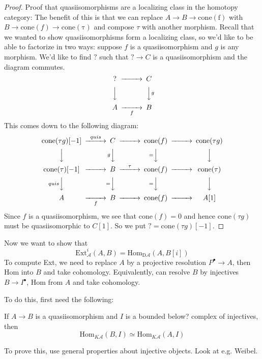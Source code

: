 \begin{proof}
    Proof that quasiisomorphisms are a localizing class in the homotopy category:  
    The benefit of this is that we can replace $A\rightarrow B\rightarrow \mathrm{cone(f)}$ with $B\rightarrow \mathrm{cone}(f)\rightarrow \mathrm{cone(\tau)}$ and compose $\tau$ with another morphism. Recall that we wanted to show quasiisomorphisms form a localizing class, so we'd like to be able to factorize in two ways: suppose $f$ is a quasiisomorphism and $g$ is any morphism. We'd like to find $?$ such that $?\rightarrow C$ is a quasiisomorphism and the diagram commutes.
    $$\begin{CD} ? @> > > C \\ @VVV @VVgV \\ A @> > f> B\end{CD}$$
    This comes down to the following diagram: 
    $$\begin{CD} \mathrm{cone}(\tau g)[-1]@> quis> > C @> > > \mathrm{cone}(f) @> > > \mathrm{cone}(\tau g)\\ @VVV @VgVV @V=VV @VVV \\ \mathrm{cone(\tau)[-1]}@> > > B @> \tau> > \mathrm{cone}(f)@> > > \mathrm{cone}(\tau) \\ @VquisVV @V=VV @V=VV @VVV \\ A @> > f > B @> > > \mathrm{cone}(f)@> > > A[1]\end{CD}$$
    Since $f$ is a quasiisomorphism, we see that $\mathrm{cone}(f)=0$ and hence $\mathrm{cone}(\tau g)$ must be quasiisomorphic to $C[1]$. So we put $?=\mathrm{cone}(\tau g)[-1]$.
\end{proof} 

Now we want to show that $$\mathrm{Ext}_{\mathcal{A}}^i(A,B)=\mathrm{Hom_{D \mathcal{A}}}(A, B[i])$$
To compute Ext, we need to replace $A$ by a projective resolution $P^\bullet \rightarrow A$, then Hom into $B$ and take cohomology. Equivalently, can resolve $B$ by injectives $B\rightarrow I^\bullet$, Hom from $A$ and take cohomology.

To do this, first need the following: 

\begin{proposition}
     If $A\rightarrow B$ is a quasiisomorphism and $I$ is a bounded below? complex of injectives, then $$\mathrm{Hom}_{K\mathcal{A}}(B,I)\simeq \mathrm{Hom}_{K\mathcal{A}}(A,I)$$
\end{proposition}

To prove this, use general properties about injective objects. Look at e.g. Weibel.

